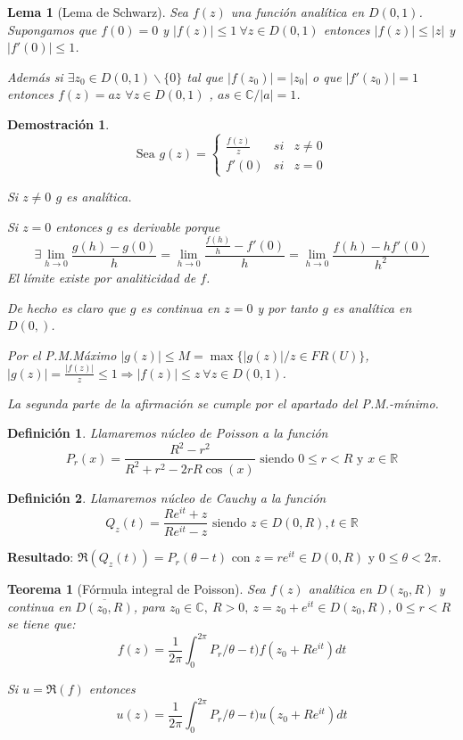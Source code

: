 \documentclass[12pt]{book}
\newtheorem{defi}{Definición}[chapter]
\newtheorem{theorem}{Teorema}[chapter]
\newtheorem*{dem}{Demostración}
\newtheorem{lema}{Lema}[chapter]
\newcommand{\R}{\mathbb{R}}
\newcommand{\C}{\mathbb{C}}
\begin{document}
\begin{lema}[Lema de Schwarz]
Sea $f(z)$ una función analítica en $D(0,1)$. Supongamos que $f(0)=0$ y $|f(z)|\leq 1\ \forall z \in D(0,1)$ entonces $|f(z)| \leq |z|$ y $|f'(0)| \leq 1$.

Además si $\exists z_0 \in D(0,1)\backslash \{0\}$ tal que $|f(z_0)| = |z_0|$ o que $|f'(z_0)| = 1$ entonces $f(z) = az$  $\forall z\in D(0,1)$ , $as \in \C/ |a|=1$.
\end{lema}

\begin{dem}
$$ \text{Sea } g(z) = \left\lbrace \begin{array}{ccc}
						\frac{f(z)}{z}& si & z\neq 0\\
						f'(0) & si & z=0\end{array}\right.$$

Si $z\neq 0$ $g$ es analítica. 

Si $z=0$ entonces $g$ es derivable porque 
$$\exists \lim_{h\to 0} \frac{g(h)-g(0)}{h} = \lim_{h\to 0} \frac{\frac{f(h)}{h}-f'(0)}{h}= \lim_{h\to 0} \frac{f(h)-hf'(0)}{h^2}$$
El límite existe por analiticidad de $f$.

De hecho es claro que $g$ es continua en $z=0$ y por tanto $g$ es analítica en $D(0,)$.

Por el P.M.Máximo $|g(z) |\leq M = \max\{|g(z)|/ z\in FR(U)\}$, $|g(z)| = \frac{|f(z)|}{z}\leq 1 \Rightarrow |f(z)| \leq z \ \forall z\in D(0,1)$.

La segunda parte de la afirmación se cumple por el apartado del P.M.-mínimo.
\end{dem}

\begin{defi}
Llamaremos núcleo de Poisson a la función 
$$P_r(x) = \frac{R^2-r^2}{R^2+r^2-2rR\cos(x)} \text{ siendo } 0\leq r < R \text{ y } x\in\R$$ 
\end{defi}

\begin{defi}
Llamaremos núcleo de Cauchy a la función 
$$Q_z(t) = \frac{Re^{it}+z}{Re^{it}-z} \text{ siendo } z\in D(0,R), t\in\R$$ 
\end{defi}
\textbf{Resultado}: $\Re(Q_z(t)) = P_r(\theta-t)$ con $z= re^{it}\in D(0,R)$ y $0\leq \theta < 2\pi$.



\begin{theorem}[Fórmula integral de Poisson]
Sea $f(z)$ analítica en $D(z_0,R)$ y continua en $\overline{D(z_0,R)}$, para $z_0\in\C,\ R>0,\ z= z_0+e^{it}\in D(z_0,R)$, $0\leq r<R$ se tiene que:
$$f(z) = \frac{1}{2\pi}\int_0^{2\pi} P_r/\theta-t)f(z_0+Re^{it})dt$$

Si $u = \Re(f)$ entonces $$u(z) = \frac{1}{2\pi}\int_0^{2\pi} P_r/\theta-t)u(z_0+Re^{it})dt$$
\end{theorem}
\end{document}
